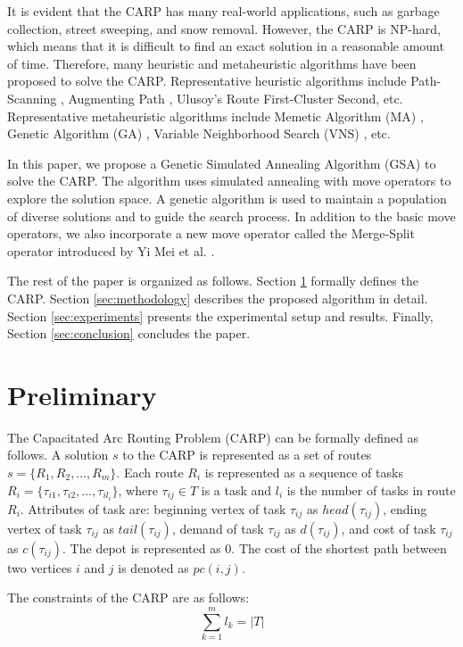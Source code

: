 \documentclass[conference]{IEEEtran}
\begin{document}
It is evident that the CARP has many real-world applications, such as garbage collection, street sweeping, and snow removal.
However, the CARP is NP-hard, which means that it is difficult to find an exact solution in a reasonable amount of time.
Therefore, many heuristic and metaheuristic algorithms have been proposed to solve the CARP.
Representative heuristic algorithms include Path-Scanning \cite{CARP}, Augmenting Path \cite{Augment-insert}, Ulusoy's Route First-Cluster Second, etc.
Representative metaheuristic algorithms include Memetic Algorithm (MA) \cite{Lacomme2004Competitive}, Genetic Algorithm (GA) \cite{Lacomme2001A}, Variable Neighborhood Search (VNS) \cite{Hertz2001A}, etc.

In this paper, we propose a Genetic Simulated Annealing Algorithm (GSA) to solve the CARP.
The algorithm uses simulated annealing with move operators to explore the solution space.
A genetic algorithm is used to maintain a population of diverse solutions and to guide the search process.
In addition to the basic move operators, we also incorporate a new move operator called the Merge-Split operator introduced by Yi Mei et al. \cite{MEANS}.

The rest of the paper is organized as follows.
Section \ref{sec:preliminary} formally defines the CARP.
Section \ref{sec:methodology} describes the proposed algorithm in detail.
Section \ref{sec:experiments} presents the experimental setup and results.
Finally, Section \ref{sec:conclusion} concludes the paper.

\section{Preliminary}
\label{sec:preliminary}

The Capacitated Arc Routing Problem (CARP) can be formally defined as follows.
A solution $s$ to the CARP is represented as a set of routes $s = \{R_1, R_2, \ldots, R_m\}$.
Each route $R_i$ is represented as a sequence of tasks $R_i = \{\tau_{i 1}, \tau_{i 2}, \ldots, \tau_{i l_i}\}$, where $\tau_{i j} \in T$ is a task and $l_i$ is the number of tasks in route $R_i$.
Attributes of task are: beginning vertex of task $\tau_{i j}$ as $head(\tau_{i j})$, ending vertex of task $\tau_{i j}$ as $tail(\tau_{i j})$, demand of task $\tau_{i j}$ as $d(\tau_{i j})$, and cost of task $\tau_{i j}$ as $c(\tau_{i j})$.
The depot is represented as $0$.
The cost of the shortest path between two vertices $i$ and $j$ is denoted as $pc(i, j)$.

The constraints of the CARP are as follows:
\begin{equation}
    \label{eq:1}
    \sum_{k=1}^{m} l_k = |T|
\end{equation}
\end{document}
